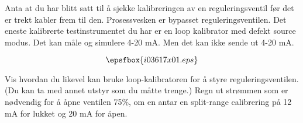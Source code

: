 

Anta at du har blitt satt til {\aa} sjekke kalibreringen av en reguleringsventil f{\o}r det er trekt kabler frem til den. Prosessvesken er bypasset reguleringsventilen. Det eneste kalibrerte testinstrumentet du har er en loop kalibrator med defekt source modus. Det kan m{\aa}le og simulere 4-20 mA. Men det kan ikke sende ut 4-20 mA.  


$$\epsfbox{i03617x01.eps}$$

Vis hvordan du likevel kan bruke loop-kalibratoren for {\aa} styre reguleringsventilen. (Du kan ta med annet utstyr som du m{\aa}tte trenge.) Regn ut str{\o}mmen som er n{\o}dvendig for {\aa} {\aa}pne ventilen 75\%, om en antar en split-range calibrering p{\aa} 12 mA for lukket og 20 mA for {\aa}pen. 


\vskip 10pt


\vfil

\eject







